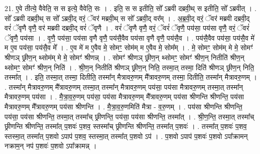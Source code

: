 \documentclass[17pt]{extarticle}
\begin{document}
21. ए॒वे तीत्ये॒ वैवेति॒ स स इत्ये॒ वैवेति॒ सः । . इति॒ स स इतीति॒ सो᳚ ऽब्रवी दब्रवी॒थ् स इतीति॒ सो᳚ ऽब्रवीत् । . सो᳚ ऽब्रवी दब्रवी॒थ् स सो᳚ ऽब्रवी॒द् वरं॒ ॅवर॑ मब्रवी॒थ् स सो᳚ ऽब्रवी॒द् वर᳚म् । . अ॒ब्र॒वी॒द् वरं॒ ॅवर॑ मब्रवी दब्रवी॒द् वरं॑ ॅवृणै वृणै॒ वर॑ मब्रवी दब्रवी॒द् वरं॑ ॅवृणै । . वरं॑ ॅवृणै वृणै॒ वरं॒ ॅवरं॑ ॅवृणै॒ पय॑सा॒ पय॑सा वृणै॒ वरं॒ ॅवरं॑ ॅवृणै॒ पय॑सा । . वृ॒णै॒ पय॑सा॒ पय॑सा वृणै वृणै॒ पय॑सै॒वैव पय॑सा वृणै वृणै॒ पय॑सै॒व । . पय॑सै॒वैव पय॑सा॒ पय॑सै॒व मे॑ म ए॒व पय॑सा॒ पय॑सै॒व मे᳚ । . ए॒व मे॑ म ए॒वैव मे॒ सोमꣳ॒॒ सोम॑म् म ए॒वैव मे॒ सोम᳚म् । . मे॒ सोमꣳ॒॒ सोम॑म् मे मे॒ सोमꣳ॑ श्रीणञ् छ्रीण॒न् थ्सोम॑म् मे मे॒ सोमꣳ॑ श्रीणन्न् । . सोमꣳ॑ श्रीणञ् छ्रीण॒न् थ्सोमꣳ॒॒ सोमꣳ॑ श्रीण॒न् नितीति॑ श्रीण॒न् थ्सोमꣳ॒॒ सोमꣳ॑ श्रीण॒न् निति॑ । . श्री॒ण॒न् नितीति॑ श्रीणञ् छ्रीण॒न् निति॒ तस्मा॒त् तस्मा॒ दिति॑ श्रीणञ् छ्रीण॒न् निति॒ तस्मा᳚त् । . इति॒ तस्मा॒त् तस्मा॒ दितीति॒ तस्मा᳚न् मैत्रावरु॒णम् मै᳚त्रावरु॒णम् तस्मा॒ दितीति॒ तस्मा᳚न् मैत्रावरु॒णम् । . तस्मा᳚न् मैत्रावरु॒णम् मै᳚त्रावरु॒णम् तस्मा॒त् तस्मा᳚न् मैत्रावरु॒णम् पय॑सा॒ पय॑सा मैत्रावरु॒णम् तस्मा॒त् तस्मा᳚न् मैत्रावरु॒णम् पय॑सा । . मै॒त्रा॒व॒रु॒णम् पय॑सा॒ पय॑सा मैत्रावरु॒णम् मै᳚त्रावरु॒णम् पय॑सा श्रीणन्ति श्रीणन्ति॒ पय॑सा मैत्रावरु॒णम् मै᳚त्रावरु॒णम् पय॑सा श्रीणन्ति । . मै॒त्रा॒व॒रु॒णमिति॑ मैत्रा - व॒रु॒णम् । . पय॑सा श्रीणन्ति श्रीणन्ति॒ पय॑सा॒ पय॑सा श्रीणन्ति॒ तस्मा॒त् तस्मा᳚च् छ्रीणन्ति॒ पय॑सा॒ पय॑सा श्रीणन्ति॒ तस्मा᳚त् । . श्री॒ण॒न्ति॒ तस्मा॒त् तस्मा᳚च् छ्रीणन्ति श्रीणन्ति॒ तस्मा᳚त् प॒शवः॑ प॒शव॒ स्तस्मा᳚च् छ्रीणन्ति श्रीणन्ति॒ तस्मा᳚त् प॒शवः॑ । . तस्मा᳚त् प॒शवः॑ प॒शव॒ स्तस्मा॒त् तस्मा᳚त् प॒शवो ऽपाप॑ प॒शव॒ स्तस्मा॒त् तस्मा᳚त् प॒शवो ऽप॑ । . प॒शवो ऽपाप॑ प॒शवः॑ प॒शवो ऽपा᳚क्रामन् नक्राम॒न् नप॑ प॒शवः॑ प॒शवो ऽपा᳚क्रामन्न् । \newline
\end{document}
